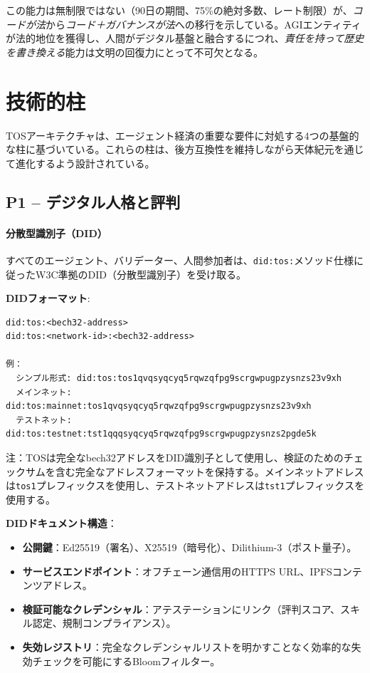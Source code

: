 \documentclass[11pt]{article}
\begin{document}
この能力は無制限ではない（90日の期間、75\%の絶対多数、レート制限）が、\emph{コードが法}から\emph{コード＋ガバナンスが法}への移行を示している。AGIエンティティが法的地位を獲得し、人間がデジタル基盤と融合するにつれ、\emph{責任を持って歴史を書き換える}能力は文明の回復力にとって不可欠となる。

\section{技術的柱}

TOSアーキテクチャは、エージェント経済の重要な要件に対処する4つの基盤的な柱に基づいている。これらの柱は、後方互換性を維持しながら天体紀元を通じて進化するよう設計されている。

\subsection{P1 -- デジタル人格と評判}
\label{sec:pillar-identity}

\paragraph{分散型識別子（DID）}
すべてのエージェント、バリデーター、人間参加者は、\texttt{did:tos:}メソッド仕様に従ったW3C準拠のDID（分散型識別子）を受け取る。

\textbf{DIDフォーマット}:
\begin{verbatim}
did:tos:<bech32-address>
did:tos:<network-id>:<bech32-address>

例：
  シンプル形式: did:tos:tos1qvqsyqcyq5rqwzqfpg9scrgwpugpzysnzs23v9xh
  メインネット: did:tos:mainnet:tos1qvqsyqcyq5rqwzqfpg9scrgwpugpzysnzs23v9xh
  テストネット: did:tos:testnet:tst1qqqsyqcyq5rqwzqfpg9scrgwpugpzysnzs2pgde5k
\end{verbatim}
注：TOSは完全なbech32アドレスをDID識別子として使用し、検証のためのチェックサムを含む完全なアドレスフォーマットを保持する。メインネットアドレスは\texttt{tos1}プレフィックスを使用し、テストネットアドレスは\texttt{tst1}プレフィックスを使用する。

\textbf{DIDドキュメント構造}：
\begin{itemize}[noitemsep]
  \item \textbf{公開鍵}：Ed25519（署名）、X25519（暗号化）、Dilithium-3（ポスト量子）。
  \item \textbf{サービスエンドポイント}：オフチェーン通信用のHTTPS URL、IPFSコンテンツアドレス。
  \item \textbf{検証可能なクレデンシャル}：アテステーションにリンク（評判スコア、スキル認定、規制コンプライアンス）。
  \item \textbf{失効レジストリ}：完全なクレデンシャルリストを明かすことなく効率的な失効チェックを可能にするBloomフィルター。
\end{itemize}
\end{document}
